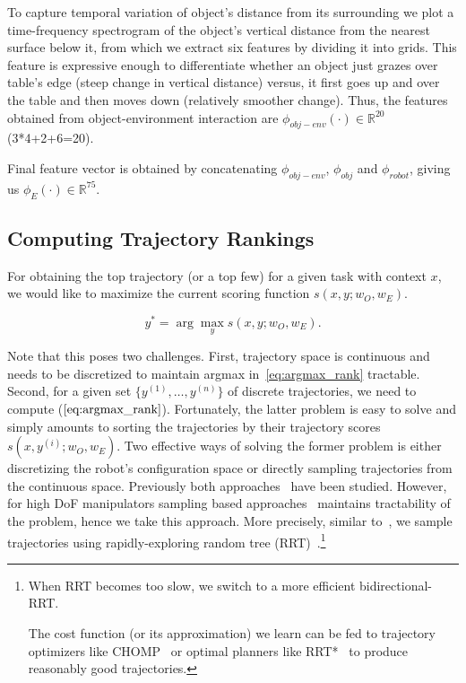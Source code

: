 To capture temporal variation of object's distance from its surrounding we plot a time-frequency spectrogram of the object's vertical distance from the nearest surface below it, from which we extract six features by dividing it into grids. This feature is expressive enough to differentiate whether an object just grazes over table's edge (steep change in vertical distance) versus, it first goes up and over the table and then moves down (relatively smoother change). Thus,  the features obtained from object-environment interaction are $\phi_{obj-env}(\cdot) \in 
\mathbb{R}^{20}$ (3*4+2+6=20).

Final feature vector is obtained by concatenating $\phi_{obj-env}$, $\phi_{obj}$ and $\phi_{robot}$,
giving us $\phi_E(\cdot) \in \mathbb{R}^{75}$.

\subsection{Computing Trajectory Rankings\label{sec:plannerranking}}

For obtaining the top trajectory  (or a top few) for a given task with context $x$, we would like to maximize the current scoring function $s(x,y;w_O,w_E)$.

\begin{equation}
y^*  = \arg\max_y s(x, {y};w_O,w_E). \label{eq:argmax_rank}
\end{equation}

Note that this poses two challenges. First, trajectory space is continuous and needs to be discretized to maintain argmax in~\eqref{eq:argmax_rank} tractable. Second, for a given set $\{y^{(1)},\ldots,y^{(n)}\}$ of discrete trajectories, we need to compute ($\ref{eq:argmax_rank}$). 
Fortunately, the latter problem is easy to solve and simply amounts to sorting the trajectories by their trajectory scores $s(x,y^{(i)};w_O,w_E)$. Two effective ways of solving the former problem is either discretizing the robot's configuration space or directly sampling trajectories from the continuous space. Previously both approaches~\citep{Alterovitz07,Berg10,Dey12,Vernaza12} have been studied. However, for high DoF manipulators sampling based approaches~\citep{Berg10,Dey12} maintains tractability of the problem, hence we take this approach. More precisely, similar to~\citet{Berg10},
we sample trajectories using rapidly-exploring random tree (RRT)~\citep{Lavalle01}.\footnote{When RRT becomes too slow, we switch to a more efficient bidirectional-RRT. 

The cost function (or its approximation) we learn can be fed to trajectory optimizers like CHOMP~\citep{Chomp} or optimal planners like RRT*~\citep{Karaman10} to produce reasonably good trajectories.}

